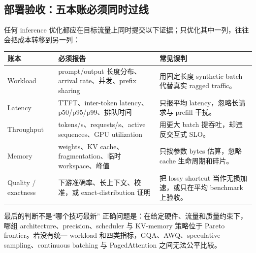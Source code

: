 \subsection{部署验收：五本账必须同时过线}

任何 inference 优化都应在目标流量上同时提交以下证据；只优化其中一列，往往会把成本转移到另一列：

\begin{longtable}{p{}p{}p{}}
\toprule
\textbf{账本} & \textbf{必须报告} & \textbf{常见误判} \\
\midrule
Workload & prompt/output 长度分布、arrival rate、并发、prefix sharing & 用固定长度 synthetic batch 代替真实 ragged traffic。 \\
Latency & TTFT、inter-token latency、p50/p95/p99、排队时间 & 只报平均 latency，忽略长请求与 prefill 干扰。 \\
Throughput & tokens/s、requests/s、active sequences、GPU utilization & 用更大 batch 提吞吐，却违反交互式 SLO。 \\
Memory & weights、KV cache、fragmentation、临时 workspace、峰值 & 只按参数 bytes 估算，忽略 cache 生命周期和碎片。 \\
Quality / exactness & 下游准确率、长上下文、校准，或 exact-distribution 证明 & 把 lossy shortcut 当作无损加速，或只在平均 benchmark 上验收。 \\
\bottomrule
\end{longtable}

\begin{warningbox}{最后的判断不是“哪个技巧最新”}
正确问题是：在给定硬件、流量和质量约束下，哪组 architecture、precision、scheduler 与 KV-memory 策略位于 Pareto frontier。若没有统一 workload 和四类指标，GQA、AWQ、speculative sampling、continuous batching 与 PagedAttention 之间无法公平比较。
\end{warningbox}


